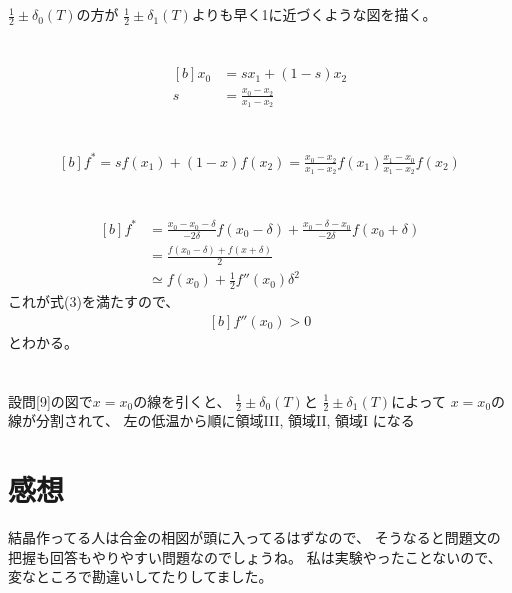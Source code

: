 \documentclass[../ap_2022.tex]{subfiles}
\begin{document}
\section{}
\(\frac{1}{2}\pm\delta_0(T)\)の方が
\(\frac{1}{2}\pm\delta_1(T)\)よりも早く1に近づくような図を描く。

\section{}
\begin{equation}\begin{aligned}[b]
    x_0 &= sx_1+(1-s)x_2\\
    s &= \frac{x_0-x_2}{x_1-x_2}
\end{aligned}\end{equation}

\section{}
\begin{equation}\begin{aligned}[b]
    f^* = sf(x_1)+(1-x)f(x_2) = \frac{x_0-x_2}{x_1-x_2}f(x_1)\frac{x_1-x_0}{x_1-x_2}f(x_2)
\end{aligned}\end{equation}

\section{}
\begin{equation}\begin{aligned}[b]
    f^* &= \frac{x_0-x_0-\delta}{-2\delta}f(x_0-\delta)+\frac{x_0-\delta-x_0}{-2\delta}f(x_0+\delta)\\
    &=\frac{f(x_0-\delta)+f(x+\delta)}{2} \\
    &\simeq f(x_0)+\frac{1}{2}f''(x_0)\delta ^2
\end{aligned}\end{equation}
これが式(3)を満たすので、
\begin{equation}\begin{aligned}[b]
    f''(x_0)>0
\end{aligned}\end{equation}
とわかる。

\section{}
設問[9]の図で\(x=x_0\)の線を引くと、
\(\frac{1}{2}\pm\delta_0(T)\)と
\(\frac{1}{2}\pm\delta_1(T)\)によって
\(x=x_0\)の線が分割されて、
左の低温から順に領域III, 領域II, 領域I になる

\section*{感想}
結晶作ってる人は合金の相図が頭に入ってるはずなので、
そうなると問題文の把握も回答もやりやすい問題なのでしょうね。
私は実験やったことないので、変なところで勘違いしてたりしてました。
\end{document}
